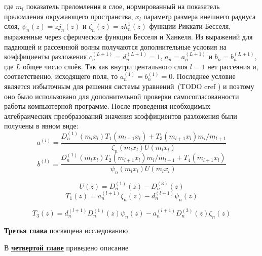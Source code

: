 где $m_l$ показатель преломления в слое, нормированный на показатель
преломления окружающего пространства, $x_l$ параметр размера внешнего
радиуса слоя, $\psi_{n}(z) = z j_n(z)$ и $\zeta_{n}(z) = z h_n^1(z)$
функции Риккати-Бесселя, выраженные через сферические функции Бесселя
и Ханкеля.  Из выражений для падающей и рассеянной волны получаются
дополнительные условия на коэффициенты разложения
$c_n^{(L+1)}=d_n^{(L+1)}=1$, $a_n=a_n^{(L+1)}$ и $b_n=b_n^{(L+1)}$,
где $L$ общее число слоёв. Так как внутри центального слоя $l=1$ нет
рассеяния и, соответственно, исходящего поля, то
$a_n^{(1)}=b_n^{(1)}=0$. Последнее условие является избыточным для
решения системы уравнений~(TODO  cref ) и поэтому оно было использовано для дополнительной
проверки самосогласованности работы компьютерной программе.  После
проведения необходимых алгебраических преобразований значения
коэффициентов разложения были получены в явном виде:
\begin{equation*}
a^{(l)} = \frac
{
    {D^{(1)}_{n}}{\left (m_{l} x_{l} \right )}
    T_1\left (m_{l+1} x_{l} \right )
    +
    T_3\left (m_{l+1} x_{l} \right )
    m_{l}/m_{l+1}
}
{
   \zeta_{n}\left (m_{l} x_{l} \right )
   U\left (m_{l} x_{l} \right )
}
\end{equation*}
\begin{equation*}
b^{(l)} = \frac
{
    {D^{(1)}_{n}}{\left (m_{l} x_{l} \right )}
    T_2\left (m_{l+1} x_{l} \right )
    m_{l}/m_{l+1}
    +
    T_4\left (m_{l+1} x_{l} \right )
}
{
   \psi_{n}\left (m_{l} x_{l} \right )
   U\left (m_{l} x_{l} \right )
}
\end{equation*}

\begin{equation*}
  U(z) =    {D^{(1)}_{n}}(z) - {D^{(3)}_{n}}(z)
\end{equation*}
\begin{equation*}
  T_1(z) =   a^{(l+1)}_{n}  \zeta_{n}(z) 
           - d^{(l+1)}_{n}  \psi_{n}(z)
\end{equation*}

\begin{equation*}
  T_3(z) =  d^{(l+1)}_{n}  D^{(1)}_{n}(z)  \psi_{n}(z) 
          - a^{(l+1)}_{n}  D^{(3)}_{n}(z)  \zeta_{n} (z)
\end{equation*}


\underline{\textbf{Третья глава}} посвящена исследованию 

В \underline{\textbf{четвертой главе}} приведено описание 


